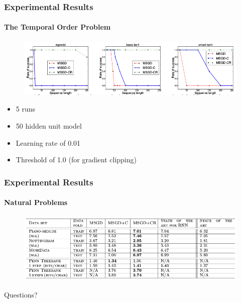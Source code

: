 \documentclass{beamer}
\begin{document}
\begin{frame}
	\frametitle{Experimental Results}	
	\framesubtitle{The Temporal Order Problem}
	
	\begin{figure}[H]
		\centering
		\includegraphics[width=\textwidth]{imgs/experimental_results}
		\label{fig:experimental_results}
	\end{figure}
	
	\begin{itemize}
		\item{5 runs}
		\item{50 hidden unit model}
		\item{Learning rate of 0.01}
		\item{Threshold of 1.0 (for gradient clipping)}
	\end{itemize}	
\end{frame}


\begin{frame}
	\frametitle{Experimental Results}	
	\framesubtitle{Natural Problems}
	
	\begin{figure}[H]
		\centering
		\includegraphics[width=\textwidth]{imgs/experimental_results_2}
		\label{fig:experimental_results}
	\end{figure}
\end{frame}


\begin{frame}
	\centering
	Questions?
\end{frame}
\end{document}
